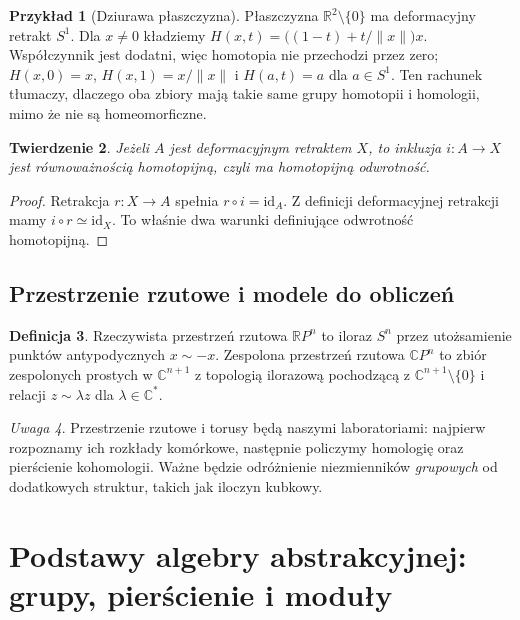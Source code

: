\documentclass[11pt,a4paper,oneside]{report}
\newcommand{\R}{\mathbb{R}}
\newcommand{\C}{\mathbb{C}}
\newcommand{\id}{\mathrm{id}}
\theoremstyle{plain}
\newtheorem{twierdzenie}{Twierdzenie}[section]
\theoremstyle{definition}
\newtheorem{definicja}[twierdzenie]{Definicja}
\newtheorem{przyklad}[twierdzenie]{Przykład}
\theoremstyle{remark}
\newtheorem{uwaga}[twierdzenie]{Uwaga}
\begin{document}
\begin{przyklad}[Dziurawa płaszczyzna]
Płaszczyzna $\R^2\setminus\{0\}$ ma deformacyjny retrakt $S^1$.
Dla $x\ne0$ kładziemy
$H(x,t)=\big((1-t)+t/\|x\|\big)x$.
Współczynnik jest dodatni, więc homotopia nie przechodzi przez zero;
$H(x,0)=x$, $H(x,1)=x/\|x\|$ i $H(a,t)=a$ dla $a\in S^1$.
Ten rachunek tłumaczy, dlaczego oba zbiory mają takie same grupy homotopii
i homologii, mimo że nie są homeomorficzne.
\end{przyklad}

\begin{twierdzenie}
Jeżeli $A$ jest deformacyjnym retraktem $X$, to inkluzja $i:A\to X$
jest równoważnością homotopijną, czyli ma homotopijną odwrotność.
\end{twierdzenie}
\begin{proof}
Retrakcja $r:X\to A$ spełnia $r\circ i=\id_A$.
Z definicji deformacyjnej retrakcji mamy $i\circ r\simeq\id_X$.
To właśnie dwa warunki definiujące odwrotność homotopijną.
\end{proof}

\section{Przestrzenie rzutowe i modele do obliczeń}

\begin{definicja}
Rzeczywista przestrzeń rzutowa $\R P^n$ to iloraz $S^n$ przez
utożsamienie punktów antypodycznych $x\sim-x$.
Zespolona przestrzeń rzutowa $\C P^n$ to zbiór zespolonych prostych
w $\C^{n+1}$ z topologią ilorazową pochodzącą z
$\C^{n+1}\setminus\{0\}$ i relacji $z\sim\lambda z$ dla $\lambda\in\C^*$.
\end{definicja}

\begin{uwaga}
Przestrzenie rzutowe i torusy będą naszymi laboratoriami: najpierw
rozpoznamy ich rozkłady komórkowe, następnie policzymy homologię oraz
pierścienie kohomologii. Ważne będzie odróżnienie niezmienników
\emph{grupowych} od dodatkowych struktur, takich jak iloczyn kubkowy.
\end{uwaga}

\chapter{Podstawy algebry abstrakcyjnej: grupy, pierścienie i moduły}
\label{ch:algebra-abstrakcyjna-v5}
\end{document}
